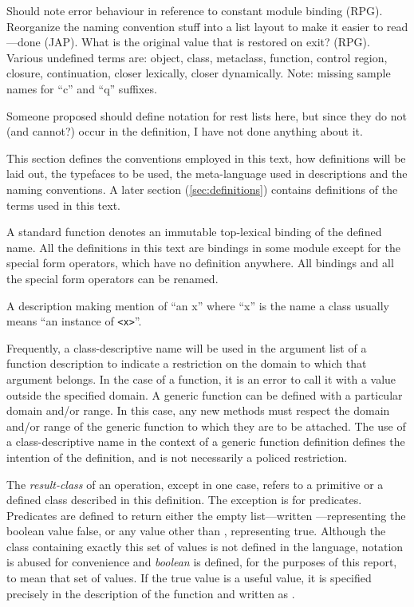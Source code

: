 %
\label{conventions}
\begin{optPrivate}
    Should note error behaviour in reference to constant module binding (RPG).
    Reorganize the naming convention stuff into a list layout to make it easier
    to read---done (JAP).  What is the original value that is restored on exit?
    (RPG).  Various undefined terms are: object, class, metaclass, function,
    control region, closure, continuation, closer lexically, closer dynamically.
    Note: missing sample names for ``c'' and ``q'' suffixes.

    Someone proposed should define notation for rest lists here, but since they
    do not (and cannot?) occur in the definition, I have not done anything about
    it.
\end{optPrivate}
%
\begin{optDefinition}
This section defines the conventions employed in this text, how
definitions will be laid out, the typefaces to be used, the
meta-language used in descriptions and the naming conventions.  A
later section (\ref{sec:definitions}) contains definitions of the
terms used in this text.

A standard function denotes an
immutable top-lexical binding of the defined name.  All the definitions in this
text are bindings in some module except for the special form operators, which
have no definition anywhere.  All bindings and all the special form operators
can be renamed.
%
\begin{note}
    A description making mention of ``an x'' where ``x'' is the name a
    class usually means ``an instance of {\tt <x>}''.
\end{note}
%
Frequently, a class-descriptive name will be used in the argument list of a
function description to indicate a restriction on the domain to which that
argument belongs.  In the case of a function, it is an error to call it with a
value outside the specified domain.  A generic function can be defined with a
particular domain and/or range.  In this case, any new methods must respect the
domain and/or range of the generic function to which they are to be attached.
The use of a class-descriptive name in the context of a generic function
definition defines the intention of the definition, and is not necessarily a
policed restriction.

The {\em result-class} of an operation, except in one case, refers to a
primitive or a defined class described in this definition.  The exception is for
predicates.  Predicates are defined to return either the empty list---written
\nil---representing the boolean value false, or any
value other than \nil, representing true.  Although the
class containing exactly this set of values is not defined in the language,
notation is abused for convenience and {\em boolean} is
defined, for the purposes of this report, to mean that set of values.  If the
true value is a useful value, it is specified precisely in the description of
the function and written as \true.
\end{optDefinition}
